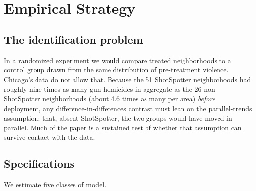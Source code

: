 \documentclass[12pt]{article}
\begin{document}
\section{Empirical Strategy}

\subsection{The identification problem}

In a randomized experiment we would compare treated neighborhoods to a control group
drawn from the same distribution of pre-treatment violence. Chicago's data do not allow
that. Because the 51 ShotSpotter neighborhoods had roughly nine times as many gun homicides in
aggregate as the 26 non-ShotSpotter neighborhoods (about 4.6 times as many per
area) \emph{before} deployment, any
difference-in-differences contrast must lean on the parallel-trends assumption: that,
absent ShotSpotter, the two groups would have moved in parallel. Much of the paper is a
sustained test of whether that assumption can survive contact with the data.

\subsection{Specifications}

We estimate five classes of model.
\end{document}
